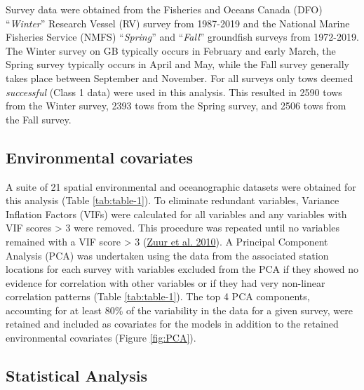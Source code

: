 \documentclass[
]{article}
\begin{document}
Survey data were obtained from the Fisheries and Oceans Canada (DFO) ``\emph{Winter}'' Research Vessel (RV) survey from 1987-2019 and the National Marine Fisheries Service (NMFS) ``\emph{Spring}'' and ``\emph{Fall}'' groundfish surveys from 1972-2019. The Winter survey on GB typically occurs in February and early March, the Spring survey typically occurs in April and May, while the Fall survey generally takes place between September and November. For all surveys only tows deemed \emph{successful} (Class 1 data) were used in this analysis. This resulted in 2590 tows from the Winter survey, 2393 tows from the Spring survey, and 2506 tows from the Fall survey.

\hypertarget{environmental-covariates}{%
\subsection{Environmental covariates}\label{environmental-covariates}}

A suite of 21 spatial environmental and oceanographic datasets were obtained for this analysis (Table \ref{tab:table-1}). To eliminate redundant variables, Variance Inflation Factors (VIFs) were calculated for all variables and any variables with VIF scores \textgreater{} 3 were removed. This procedure was repeated until no variables remained with a VIF score \textgreater{} 3 (\protect\hyperlink{ref-zuurProtocolDataExploration2010}{Zuur et al. 2010}). A Principal Component Analysis (PCA) was undertaken using the data from the associated station locations for each survey with variables excluded from the PCA if they showed no evidence for correlation with other variables or if they had very non-linear correlation patterns (Table \ref{tab:table-1}). The top 4 PCA components, accounting for at least 80\% of the variability in the data for a given survey, were retained and included as covariates for the models in addition to the retained environmental covariates (Figure \ref{fig:PCA}).

\hypertarget{statistical-analysis}{%
\subsection{Statistical Analysis}\label{statistical-analysis}}
\end{document}
